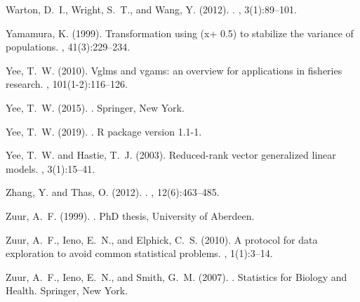 \documentclass[a4paper,11pt]{article}
\begin{document}
\begin{thebibliography}{}
Warton, D.~I., Wright, S.~T., and Wang, Y. (2012).
.
, 3(1):89--101.

Yamamura, K. (1999).
\newblock Transformation using (x+ 0.5) to stabilize the variance of
  populations.
, 41(3):229--234.

Yee, T.~W. (2010).
\newblock Vglms and vgams: an overview for applications in fisheries research.
, 101(1-2):116--126.

Yee, T.~W. (2015).
.
\newblock Springer, New York.

Yee, T.~W. (2019).
.
\newblock R package version 1.1-1.

Yee, T.~W. and Hastie, T.~J. (2003).
\newblock Reduced-rank vector generalized linear models.
, 3(1):15--41.

Zhang, Y. and Thas, O. (2012).
.
, 12(6):463--485.

Zuur, A.~F. (1999).
.
\newblock PhD thesis, University of Aberdeen.

Zuur, A.~F., Ieno, E.~N., and Elphick, C.~S. (2010).
\newblock A protocol for data exploration to avoid common statistical problems.
, 1(1):3--14.

Zuur, A.~F., Ieno, E.~N., and Smith, G.~M. (2007).
.
\newblock Statistics for Biology and Health. Springer, New York.

\end{thebibliography}
\end{document}
